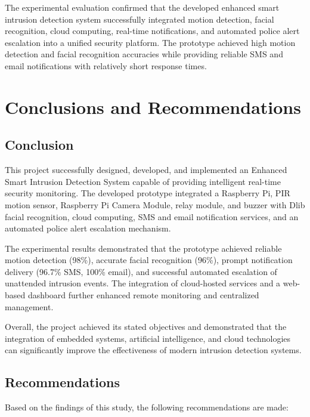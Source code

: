 \documentclass[12pt,a4paper,oneside]{report}
\begin{document}
The experimental evaluation confirmed that the developed enhanced smart intrusion detection system successfully integrated motion detection, facial recognition, cloud computing, real-time notifications, and automated police alert escalation into a unified security platform. The prototype achieved high motion detection and facial recognition accuracies while providing reliable SMS and email notifications with relatively short response times.

\chapter{Conclusions and Recommendations}

\section{Conclusion}

This project successfully designed, developed, and implemented an Enhanced Smart Intrusion Detection System capable of providing intelligent real-time security monitoring. The developed prototype integrated a Raspberry Pi, PIR motion sensor, Raspberry Pi Camera Module, relay module, and buzzer with Dlib facial recognition, cloud computing, SMS and email notification services, and an automated police alert escalation mechanism.

The experimental results demonstrated that the prototype achieved reliable motion detection (98\%), accurate facial recognition (96\%), prompt notification delivery (96.7\% SMS, 100\% email), and successful automated escalation of unattended intrusion events. The integration of cloud-hosted services and a web-based dashboard further enhanced remote monitoring and centralized management.

Overall, the project achieved its stated objectives and demonstrated that the integration of embedded systems, artificial intelligence, and cloud technologies can significantly improve the effectiveness of modern intrusion detection systems.

\section{Recommendations}

Based on the findings of this study, the following recommendations are made:
\end{document}
